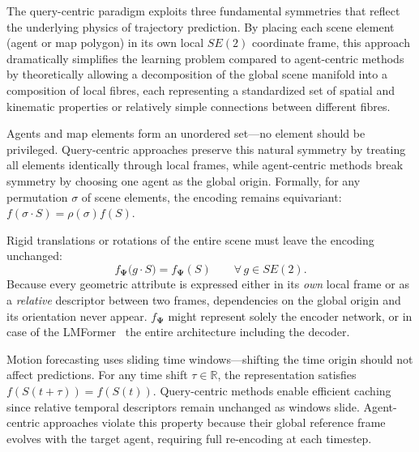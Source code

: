 The query-centric paradigm exploits three fundamental symmetries that reflect the underlying physics of trajectory prediction. By placing each scene element (agent or map polygon) in its own local \(SE(2)\) coordinate frame, this approach dramatically simplifies the learning problem compared to agent-centric methods by theoretically allowing a decomposition of the global scene manifold into a composition of local fibres, each representing a standardized set of spatial and kinematic properties or relatively simple connections between different fibres.

\begin{description}[style=nextline,leftmargin=*]
\item[Permutation invariance.] %
    Agents and map elements form an unordered set—no element should be  privileged. Query-centric approaches preserve this natural symmetry by treating all elements identically through local frames, while agent-centric methods break symmetry by choosing one agent as the global origin. Formally, for any permutation \(\sigma\) of scene elements, the encoding remains equivariant: \(f(\sigma \cdot S) = \rho(\sigma) f(S)\).

\item[SE(2) invariance.]
      Rigid translations or rotations of the entire scene must leave the encoding unchanged:
      \begin{equation}
        f_{\boldsymbol{\Psi}}\!\bigl(g\!\cdot\!S\bigr)=f_{\boldsymbol{\Psi}}(S)\qquad\forall\,g\in SE(2).
      \end{equation}
      Because every geometric attribute is expressed either in its \emph{own} local frame or as a \emph{relative} descriptor between two frames, dependencies on the global origin and its orientation never appear. \( f_{\boldsymbol{\Psi}} \) might represent solely the encoder network, or in case of the LMFormer~\cite{lmformerYadav2025} the entire architecture including the decoder.
\item[Temporal translation invariance.]
    Motion forecasting uses sliding time windows—shifting the time origin should not affect predictions. For any time shift \(\tau\in\mathbb{R}\), the representation satisfies \(f(S(t+\tau))=f(S(t))\). Query-centric methods enable efficient caching since relative temporal descriptors remain unchanged as windows slide. Agent-centric approaches violate this property because their global reference frame evolves with the target agent, requiring full re-encoding at each timestep.
\end{description}

